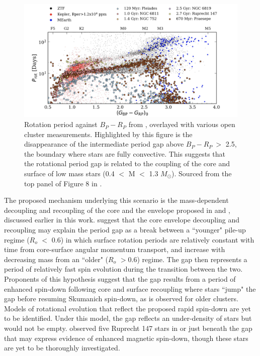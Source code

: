 \begin{figure}[h]
    \includegraphics[width=\textwidth]{Figures/intro_figures/ztf_comp.png}
    \caption[Rotation period distribution including fully convective stars.]{Rotation period against \gaia{} $B_P - R_P$ from \kepler{}, \ZTF{} overlayed with various open cluster measurements. Highlighted by this figure is the disappearance of the intermediate period gap above $B_P-R_P \ >$ 2.5, the boundary where stars are fully convective. This suggests that the rotational period gap is related to the coupling of the core and surface of low mass stars (0.4 $<$ M $<$ 1.3 $M_{\odot}$). Sourced from the top panel of Figure 8 in \citet{lu_bridging_2022}.}
    \label{fig:ztf_comp}
\end{figure}

The proposed mechanism underlying this scenario is the mass-dependent decoupling and recoupling of the core and the envelope proposed in 
\citet{lanzafame_rotational_2015} and \citet{spada_competing_2020}, discussed earlier in this work.
\citet{angus_exploring_2020} suggest that the core envelope decoupling and recoupling may explain the period gap as a break between a ``younger" pile-up regime ($R_o$ $<$ 0.6) in which surface rotation periods are relatively constant with time from core-surface angular momentum transport, and increase with decreasing mass from an ``older" ($R_o$ $>$0.6) regime.
The gap then represents a period of relatively fast spin evolution during the transition between the two.
Proponents of this hypothesis suggest that the gap results from a period of enhanced spin-down following core and surface recoupling where stars ``jump" the gap before resuming Skumanich spin-down, as is observed for older clusters.
Models of rotational evolution  that reflect the proposed rapid spin-down are yet to be identified.
Under this model, the gap reflects an under-density of stars but would not be empty.
\citet{curtis_when_2020} observed five Ruprecht 147 stars in or just beneath the gap that may express evidence of enhanced magnetic spin-down, though these stars are yet to be thoroughly investigated.

